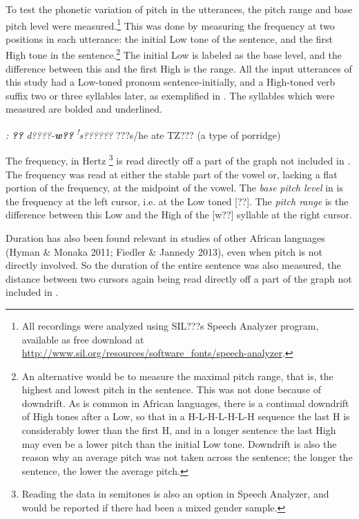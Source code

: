 \documentclass[output=paper]{langsci/langscibook}
\begin{document}
To test the phonetic variation of pitch in the utterances, the pitch range and base pitch level were measured.\footnote{ All recordings were analyzed using SIL???s Speech Analyzer program, available as free download at \url{http://www.sil.org/resources/software_fonts/speech-analyzer}.} This was done by measuring the frequency at two positions in each utterance: the initial Low tone of the sentence, and the first High tone in the sentence.\footnote{ An alternative would be to measure the maximal pitch range, that is, the highest and lowest pitch in the sentence. This was not done because of downdrift. As is common in African languages, there is a continual downdrift of High tones after a Low, so that in a H-L-H-L-H-L-H sequence the last H is considerably lower than the first H, and in a longer sentence the last High may even be a lower pitch than the initial Low tone. Downdrift is also the reason why an average pitch was not taken across the sentence; the longer the sentence, the lower the average pitch.} The initial Low is labeled as the base level, and the difference between this and the first High is the range. All the input utterances of this study had a Low-toned pronoun sentence-initially, and a High-toned verb suffix two or three syllables later, as exemplified in . The syllables which were measured are bolded and underlined.


  
 

\emph{\textup{:}}  \emph{\textbf{??}}\emph{\textbf{ }}\emph{  d????-}\emph{\textbf{w??}}\emph{  }\textit{\textsuperscript{!}}\emph{s??????}  ???s/he ate TZ???    (a type of porridge)

The frequency, in Hertz \footnote{ Reading the data in semitones is also an option in Speech Analyzer, and would be reported if there had been a mixed gender sample.} is read directly off a part of the graph not included in . The frequency was read at either the stable part of the vowel or, lacking a flat portion of the frequency, at the midpoint of the vowel.  The \emph{base} \emph{pitch level} in  is the frequency at the left cursor, i.e. at the Low toned [??]. The \emph{pitch range} is the difference between this Low and the High of the [w??] syllable at the right cursor. 

Duration has also been found relevant in studies of other African languages (Hyman \& Monaka 2011; Fiedler \& Jannedy 2013), even when pitch is not directly involved. So the duration of the entire sentence was also measured, the distance between two cursors again being read directly off a part of the graph not included in .
\end{document}
